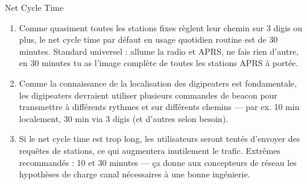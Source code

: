 \begin{aprssideblock}{Net Cycle Time}
\begin{enumerate}
  \begin{itemize}
  \tightlist
  \item
    Opération directe (aucun digipeater) : 10 minutes (probablement un
    événement).
  \item
    1 hop : 10 minutes (probablement un événement).
  \item
    2 hops : 20 minutes.
  \item
    3 hops ou plus : 30 minutes.
  \end{itemize}
\item
  Comme quasiment toutes les stations fixes règlent leur chemin sur 3
  digis ou plus, le net cycle time par défaut en usage quotidien routine
  est de 30 minutes. Standard universel : allume la radio et APRS, ne
  fais rien d'autre, en 30 minutes tu as l'image complète de toutes les
  stations APRS à portée.
\item
  Comme la connaissance de la localisation des digipeaters est
  fondamentale, les digipeaters devraient utiliser plusieurs commandes
  de beacon pour transmettre à différents rythmes et sur différents
  chemins --- par ex. 10 min localement, 30 min via 3 digis (et d'autres
  selon besoin).
\item
  Si le net cycle time est trop long, les utilisateurs seront tentés
  d'envoyer des requêtes de stations, ce qui augmentera inutilement le
  trafic. Extrêmes recommandés : 10 et 30 minutes --- ça donne aux
  concepteurs de réseau les hypothèses de charge canal nécessaires à une
  bonne ingénierie.
\end{enumerate}
\end{aprssideblock}

